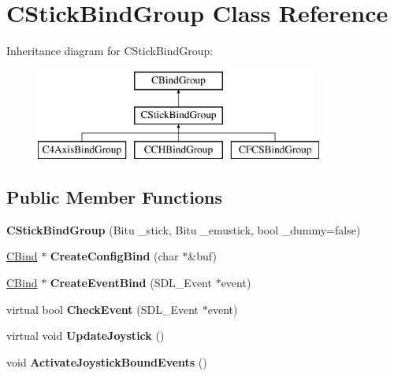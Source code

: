 \hypertarget{classCStickBindGroup}{\section{C\-Stick\-Bind\-Group Class Reference}
\label{classCStickBindGroup}
}
Inheritance diagram for C\-Stick\-Bind\-Group\-:\begin{figure}[H]
\begin{center}
\leavevmode
\includegraphics[height=3.000000cm]{classCStickBindGroup}
\end{center}
\end{figure}
\subsection*{Public Member Functions}
\begin{DoxyCompactItemize}
\item 
\hypertarget{classCStickBindGroup_a9d3fcb845546413778f898901a15c5df}{{\bfseries C\-Stick\-Bind\-Group} (Bitu \-\_\-stick, Bitu \-\_\-emustick, bool \-\_\-dummy=false)}\label{classCStickBindGroup_a9d3fcb845546413778f898901a15c5df}

\item 
\hypertarget{classCStickBindGroup_ae2878c524823fd0cb37122da45ae863f}{\hyperlink{classCBind}{C\-Bind} $\ast$ {\bfseries Create\-Config\-Bind} (char $\ast$\&buf)}\label{classCStickBindGroup_ae2878c524823fd0cb37122da45ae863f}

\item 
\hypertarget{classCStickBindGroup_ad4f7165ae326ca17f1f2b408d06d47ae}{\hyperlink{classCBind}{C\-Bind} $\ast$ {\bfseries Create\-Event\-Bind} (S\-D\-L\-\_\-\-Event $\ast$event)}\label{classCStickBindGroup_ad4f7165ae326ca17f1f2b408d06d47ae}

\item 
\hypertarget{classCStickBindGroup_aa7aac5437224f7a369bb7388925728eb}{virtual bool {\bfseries Check\-Event} (S\-D\-L\-\_\-\-Event $\ast$event)}\label{classCStickBindGroup_aa7aac5437224f7a369bb7388925728eb}

\item 
\hypertarget{classCStickBindGroup_ab90c042b57e3b26c64a43ff47e61de99}{virtual void {\bfseries Update\-Joystick} ()}\label{classCStickBindGroup_ab90c042b57e3b26c64a43ff47e61de99}

\item 
\hypertarget{classCStickBindGroup_a7d53d30feb04029f104f45e9c741e565}{void {\bfseries Activate\-Joystick\-Bound\-Events} ()}\label{classCStickBindGroup_a7d53d30feb04029f104f45e9c741e565}

\end{DoxyCompactItemize}
